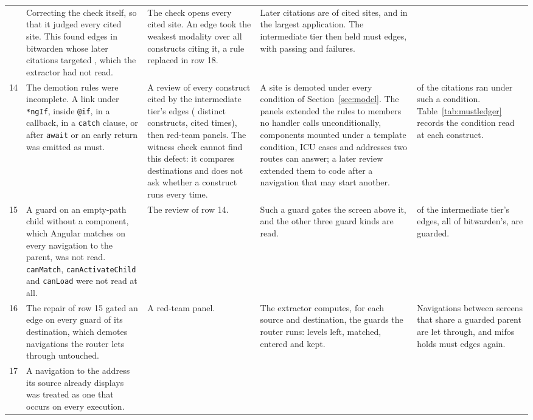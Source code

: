 \begin{xltabular}{\textwidth}{@{}rYYYY@{}}
  & Correcting the check itself, so that it judged every cited site. This found edges in bitwarden whose later citations targeted , which the extractor had not read.
  & The check opens every cited site. An edge took the weakest modality over all constructs citing it, a rule replaced in row 18.
  & Later citations are \WitnessMergedCitationShareAll{} of cited sites, and \WitnessMergedCitationShareMax{} in the largest application. The intermediate tier then held \RoundMustEdges{} must edges, with \RoundMustClean{} passing and \RoundMustViolations{} failures. \\
14 & The demotion rules were incomplete. A link under \texttt{*ngIf}, inside \texttt{@if}, in a callback, in a \texttt{catch} clause, or after \texttt{await} or an early return was emitted as must.
  & A review of every construct cited by the intermediate tier's \MustCtxEdges{} edges (\MustCtxDistinct{} distinct constructs, cited \MustCtxConstructs{} times), then red-team panels. The witness check cannot find this defect: it compares destinations and does not ask whether a construct runs every time.
  & A site is demoted under every condition of Section~\ref{sec:model}. The panels extended the rules to members no handler calls unconditionally, components mounted under a template condition, ICU cases and addresses two routes can answer; a later review extended them to code after a navigation that may start another.
  & \MustCtxConditional{} of the \MustCtxConstructs{} citations ran under such a condition. Table~\ref{tab:mustledger} records the condition read at each construct. \\
15 & A guard on an empty-path child without a component, which Angular matches on every navigation to the parent, was not read. \texttt{canMatch}, \texttt{canActivateChild} and \texttt{canLoad} were not read at all.
  & The review of row 14.
  & Such a guard gates the screen above it, and the other three guard kinds are read.
  & \MustFateGuard{} of the intermediate tier's edges, all of bitwarden's, are guarded. \\
16 & The repair of row 15 gated an edge on every guard of its destination, which demotes navigations the router lets through untouched.
  & A red-team panel.
  & The extractor computes, for each source and destination, the guards the router runs: levels left, matched, entered and kept.
  & Navigations between screens that share a guarded parent are let through, and mifos holds \CensusMustMifos{} must edges again. \\
17 & A navigation to the address its source already displays was treated as one that occurs on every execution.

\end{xltabular}
